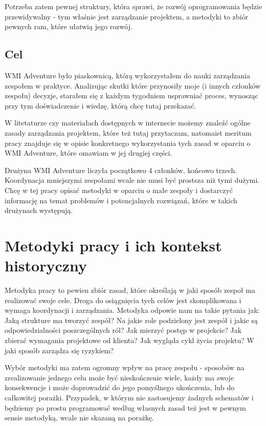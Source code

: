 \documentclass{article}
\begin{document}
Potrzeba zatem pewnej struktury, która sprawi, że rozwój oprogramowania będzie przewidywalny - tym właśnie jest zarządzanie projektem, a metodyki to zbiór pewnych ram, które ułatwią jego rozwój.

\subsection{Cel}
WMI Adventure było piaskownicą, którą wykorzystałem do nauki zarządzania zespołem w praktyce. Analizując skutki które przynosiły moje (i innych członków zespołu) decyzje, starałem się z każdym tygodniem usprawniać
proces, wynosząc przy tym doświadczenie i  wiedzę, którą chcę tutaj przekazać.

W litetaturze czy materiałach dostępnych w internecie możemy znaleźć ogólne zasady zarządzania projektem, które też tutaj przytaczam, natomaist
meritum pracy znajduje się w opisie konkretnego wykorzystania tych zasad w oparciu o WMI Adventure, które omawiam w jej drugiej części.

Drużyna WMI Adventure liczyła początkowo 4 członków, końcowo trzech. Koordynacja mniejszymi zespołami wcale nie musi być prostsza niż tymi dużymi. Chcę w tej pracy opisać metodyki w oparciu o małe zespoły i dostarczyć informację na temat problemów i potencjalnych rozwiązań, które w takich drużynach
występują.

\section{Metodyki pracy i ich kontekst historyczny}
Metodyka pracy to pewien zbiór zasad, które określają w jaki sposób zespoł ma realizować swoje cele. Droga do osiągnięcia tych celów jest skomplikowana i wymaga koordynacji i zarządzania. Metodyka odpowie nam na takie pytania jak: Jaką strukture ma tworzyć zespół? Na jakie role podzielony jest zespół i jakie są odpowiedzialności poszczególnych ról? Jak mierzyć postęp w projekcie? Jak zbierać wymagania projektowe od klienta? Jak wygląda cykl życia projektu? W jaki sposób zarządza się ryzykiem?

Wybór metodyki ma zatem ogromny wpływ na pracę zespołu - sposobów na zrealizowanie jednego celu może być nieskończenie wiele, każdy ma swoje konsekwencje i może doprowadzić do jego pomyślnego ukończenia, lub do całkowitej porażki. Przypadek, w którym nie zastosujemy żadnych schematów i będziemy po prostu programować według własnych zasad też jest w pewnym sensie metodyką, wcale nie skazaną na porażkę.
\end{document}
